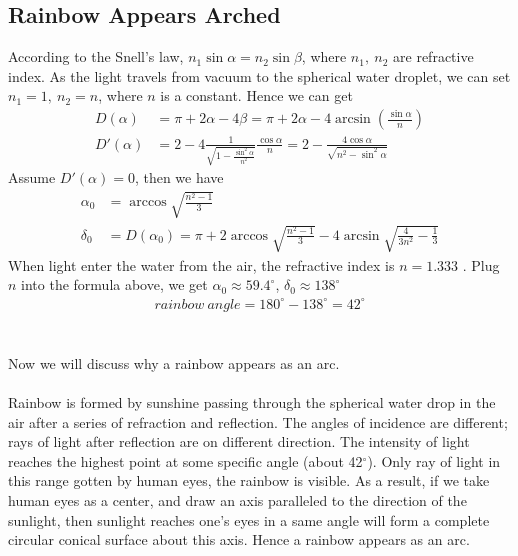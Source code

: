 \documentclass{article}
\begin{document}
\begin{spacing}{1.5}
\subsection{Rainbow Appears Arched}
\label{abc}
According to the Snell's law, $n_1\sin\alpha = n_2\sin\beta$, where $n_1, \ n_2$ are refractive index. As the light travels from vacuum to the spherical water droplet, we can set $n_1=1, \ n_2=n$, where $n$ is a constant. Hence we can get
\begin{align*}
D(\alpha)&=\pi+ 2\alpha -4\beta =\pi +2\alpha - 4\arcsin(\frac{\sin\alpha}{n})\\
D'(\alpha) &= 2 - 4\frac{1}{\sqrt{1-\frac{\sin^2\alpha}{n^2}}}\frac{\cos \alpha}{n}=2-\frac{4\cos \alpha}{\sqrt{n^2-\sin^2\alpha}}
\end{align*}
Assume $D'(\alpha)=0$, then we have \begin{align*}\alpha_0&=\arccos\sqrt{\frac{n^2-1}{3}}\\\delta_0&=D(\alpha_0)=\pi+2\arccos\sqrt{\frac{n^2-1}{3}}-4\arcsin\sqrt{\frac{4}{3n^2}-\frac{1}{3}}
\end{align*}
When light enter the water from the air, the refractive index is $n=1.333$ \cite{Optics}. Plug $n$ into the formula above, we get $\alpha_0 \approx 59.4^{\circ}$, $\delta_0\approx 138^{\circ}$\\
\begin{align*}
rainbow\ angle=180^{\circ}-138^{\circ}=42^{\circ}
\end{align*}\\
\\
Now we will discuss why a rainbow appears as an arc.\\
\\
Rainbow is formed by sunshine passing through the spherical water drop in the air after a series of refraction and reflection. The angles of incidence are different; rays of light after reflection are on different direction. The intensity of light reaches the highest point at some specific angle (about 42$^{\circ}$). Only ray of light in this range gotten by human eyes, the rainbow is visible. As a result, if we take human eyes as a center, and draw an axis paralleled to the direction of the sunlight, then sunlight reaches one’s eyes in a same angle will form a complete circular conical surface about this axis. Hence a rainbow appears as an arc.
\newpage

\end{spacing}
\end{document}
